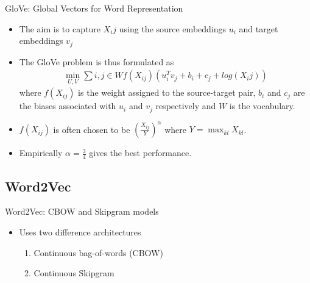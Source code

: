 \documentclass{beamer}
\begin{document}
\begin{frame}{GloVe: Global Vectors for Word Representation}
  \begin{itemize}
   \item<2-> The aim is to capture $X_ij$ using the source embeddings $u_i$ and target embeddings $v_j$
   \item<3-> The GloVe problem is thus formulated as 
   \begin{align}
    \min_{U,V} \sum{i,j \in W} f(X_{ij})(u_i^Tv_j + b_i + c_j + log (X_ij))
   \end{align}
    where $f(X_{ij})$ is the weight assigned to the source-target pair, $b_i$ and $c_j$ are the 
    biases associated with $u_i$ and $v_j$ respectively and $W$ is the vocabulary.
    \item<4-> $f(X_{ij})$ is often chosen to be $(\frac{X_{ij}}{Y})^\alpha$ where $Y = \max_{kl}X_{kl}$.
    \item<5-> Empirically $\alpha = \frac{3}{4}$ gives the best performance.

  \end{itemize}
  
\end{frame}


\subsection{Word2Vec}
\begin{frame}{Word2Vec: CBOW and Skipgram models}
  \begin{itemize}
   \item<2-> Uses two difference architectures
   \begin{enumerate}
    \item<3-> Continuous bag-of-words (CBOW)
    \item<4-> Continuous Skipgram
  \end{enumerate}  
   \end{itemize}
  
\end{frame}
\end{document}
